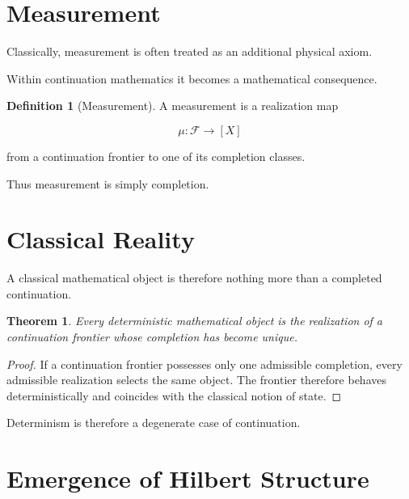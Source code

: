 \documentclass[13pt,openany]{book}
\theoremstyle{plain}
\newtheorem{theorem}{Theorem}[chapter]
\theoremstyle{definition}
\newtheorem{definition}{Definition}[chapter]
\begin{document}
\section{Measurement}

Classically, measurement is often treated as an additional physical axiom.

Within continuation mathematics it becomes a mathematical consequence.

\begin{definition}[Measurement]
A measurement is a realization map

\[
\mu :
\mathcal F
\longrightarrow
[X]
\]

from a continuation frontier to one of its completion classes.
\end{definition}

Thus measurement is simply completion.

\section{Classical Reality}

A classical mathematical object is therefore nothing more than a completed
continuation.

\begin{theorem}
Every deterministic mathematical object is the realization of a continuation
frontier whose completion has become unique.
\end{theorem}

\begin{proof}
If a continuation frontier possesses only one admissible completion, every
admissible realization selects the same object. The frontier therefore behaves
deterministically and coincides with the classical notion of state.
\end{proof}

Determinism is therefore a degenerate case of continuation.

\section{Emergence of Hilbert Structure}
\end{document}
